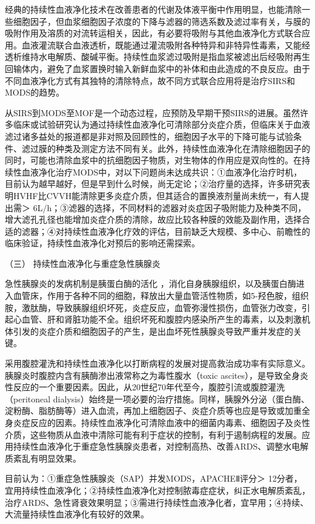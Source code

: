 经典的持续性血液净化技术在改善患者的代谢及体液平衡中作用明显，也能清除一些细胞因子，但血浆细胞因子浓度的下降与滤器的筛选系数及滤过率有关，与膜的吸附作用及溶质的对流转运相关，因此，有必要将吸附与其他血液净化方式联合应用。血液灌流联合血液透析，既能通过灌流吸附各种特异和非特异性毒素，又能经透析维持水电解质、酸碱平衡。持续性血浆滤过吸附是指血浆被滤出后经吸附再生回输体内，避免了血浆置换时输入新鲜血浆中的补体和由此造成的不良反应。由于不同血液净化方式有其独特的清除特点，故不同方式联合应用将是治疗SIRS和MODS的趋势。

从SIRS到MODS至MOF是一个动态过程，应预防及早期干预SIRS的进展。虽然许多临床或试验研究认为通过持续性血液净化可清除部分炎症介质，但临床关于血液滤过诸多益处的报道都是非对照及回顾性的，细胞因子水平的下降可能与试验条件、滤过膜的种类及测定方法不同有关。此外，持续性血液净化在清除细胞因子的同时，可能也清除血浆中的抗细胞因子物质，对生物体的作用应是双向性的。在持续性血液净化治疗MODS中，对以下问题尚未达成共识：①血液净化治疗时机，目前认为越早越好，但是早到什么时候，尚无定论；②治疗量的选择，许多研究表明HVHF比CVVH能清除更多炎症介质，但其适合的置换液剂量尚未统一，有人提出需＞
6L/h；③滤器的选择，不同材料的滤器对炎症因子吸附能力及种类不同，增大滤孔孔径也能增加炎症介质的清除，故应比较各种膜的效能及副作用，选择合适的滤器；④对持续性血液净化疗效的评估，目前缺乏大规模、多中心、前瞻性的临床验证，持续性血液净化对预后的影响还需探索。

\hypertarget{text00391.htmlux5cux23CHP16-10-2-2-3}{}
（三） 持续性血液净化与重症急性胰腺炎

急性胰腺炎的发病机制是胰蛋白酶的活化
，消化自身胰腺组织，以及胰蛋白酶进入血管床，作用于各种不同的细胞，释放出大量血管活性物质，如5-羟色胺，组织胺，激肽酶，导致胰腺组织坏死，炎症反应，血管弥漫性损伤，血管张力改变，引起心血管、肝和肾脏功能不全。组织坏死和腹腔内感染所产生的毒素，以及刺激机体引发的炎症介质和细胞因子的产生，是出血坏死性胰腺炎导致严重并发症的关键。

采用腹腔灌洗和持续性血液净化以打断病程的发展对提高救治成功率有实际意义。胰腺炎时腹腔内含有胰酶渗出液常称之为毒性腹水（toxic
ascites），是导致全身炎性反应的一个重要因素。因此，从20世纪70年代至今，腹腔引流或腹腔灌洗（peritoneal
dialysis）始终是一项必要的治疗措施。同样，胰腺外分泌（蛋白酶、淀粉酶、脂肪酶等）进入血流，再加上细胞因子、炎症介质等也应是导致或加重全身炎症反应的因素。持续性血液净化可清除血液中的细菌内毒素、细胞因子及炎性介质，这些物质从血液中清除可能有利于症状的控制，有利于遏制病程的发展。应用持续性血液净化于重症急性胰腺炎患者，对控制高热、改善ARDS、调整水电解质紊乱有明显效果。

目前认为：①重症急性胰腺炎（SAP）并发MODS，APACHEⅡ评分＞
12分者，宜用持续性血液净化；②持续性血液净化对控制脓毒症症状，纠正水电解质紊乱，治疗ARDS、急性肾衰效果明显；③需进行持续性血液净化者，宜早用；④持续、大流量持续性血液净化有较好的效果。

